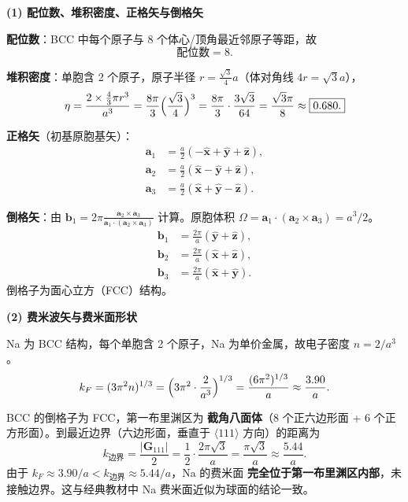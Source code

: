 \begin{derivationbox}[标准解题过程]
\textbf{(1) 配位数、堆积密度、正格矢与倒格矢}

\textbf{配位数}：BCC 中每个原子与 8 个体心/顶角最近邻原子等距，故
\begin{equation}
\boxed{\text{配位数}=8.}
\end{equation}

\textbf{堆积密度}：单胞含 2 个原子，原子半径 $r=\frac{\sqrt{3}}{4}a$（体对角线 $4r=\sqrt{3}a$），
\begin{equation}
\eta=\frac{2\times\frac{4}{3}\pi r^3}{a^3}
=\frac{8\pi}{3}\Bigl(\frac{\sqrt{3}}{4}\Bigr)^3
=\frac{8\pi}{3}\cdot\frac{3\sqrt{3}}{64}
=\frac{\sqrt{3}\pi}{8}\approx\boxed{0.680.}
\end{equation}

\textbf{正格矢}（初基原胞基矢）：
\begin{equation}
\boxed{
\begin{aligned}
\bm{a}_1&=\frac{a}{2}(-\hat{\bm{x}}+\hat{\bm{y}}+\hat{\bm{z}}),\\
\bm{a}_2&=\frac{a}{2}(\hat{\bm{x}}-\hat{\bm{y}}+\hat{\bm{z}}),\\
\bm{a}_3&=\frac{a}{2}(\hat{\bm{x}}+\hat{\bm{y}}-\hat{\bm{z}}).
\end{aligned}
}
\end{equation}

\textbf{倒格矢}：由 $\bm{b}_1=2\pi\frac{\bm{a}_2\times\bm{a}_3}{\bm{a}_1\cdot(\bm{a}_2\times\bm{a}_3)}$ 计算。原胞体积 $\Omega=\bm{a}_1\cdot(\bm{a}_2\times\bm{a}_3)=a^3/2$。
\begin{equation}
\boxed{
\begin{aligned}
\bm{b}_1&=\frac{2\pi}{a}(\hat{\bm{y}}+\hat{\bm{z}}),\\
\bm{b}_2&=\frac{2\pi}{a}(\hat{\bm{x}}+\hat{\bm{z}}),\\
\bm{b}_3&=\frac{2\pi}{a}(\hat{\bm{x}}+\hat{\bm{y}}).
\end{aligned}
}
\end{equation}
倒格子为面心立方（FCC）结构。

\textbf{(2) 费米波矢与费米面形状}

Na 为 BCC 结构，每个单胞含 2 个原子，Na 为单价金属，故电子密度 $n=2/a^3$。
\begin{equation}
k_F=(3\pi^2 n)^{1/3}=\Bigl(3\pi^2\cdot\frac{2}{a^3}\Bigr)^{1/3}
=\frac{(6\pi^2)^{1/3}}{a}\approx\frac{3.90}{a}.
\end{equation}

BCC 的倒格子为 FCC，第一布里渊区为 \textbf{截角八面体}（8 个正六边形面 + 6 个正方形面）。到最近边界（六边形面，垂直于 $\langle111\rangle$ 方向）的距离为
\begin{equation}
k_{\text{边界}}=\frac{|\bm{G}_{111}|}{2}=\frac{1}{2}\cdot\frac{2\pi\sqrt{3}}{a}=\frac{\pi\sqrt{3}}{a}\approx\frac{5.44}{a}.
\end{equation}
由于 $k_F\approx3.90/a < k_{\text{边界}}\approx5.44/a$，Na 的费米面 \textbf{完全位于第一布里渊区内部}，未接触边界。这与经典教材中 Na 费米面近似为球面的结论一致。


\end{derivationbox}
